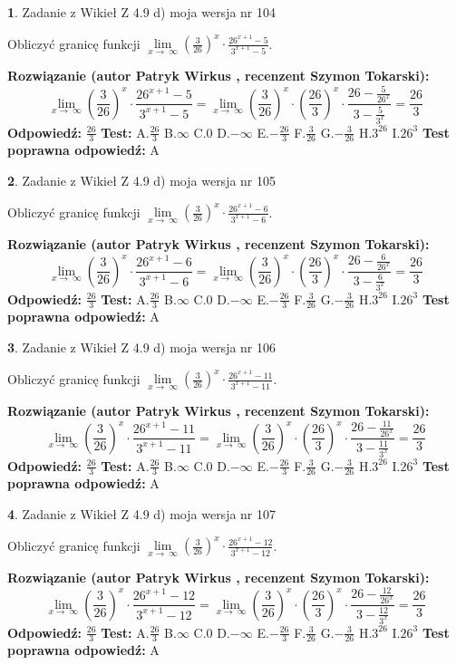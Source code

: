 \documentclass[12pt, a4paper]{article}
\theoremstyle{definition} %
\newtheorem{zad}{}
\newcommand{\zadStart}[1]{\begin{zad}#1\newline}
\newcommand{\zadStop}{\end{zad}}
\newcommand{\rozwStart}[2]{\noindent \textbf{Rozwiązanie (autor #1 , recenzent #2): }\newline}
\newcommand{\rozwStop}{\newline}
\newcommand{\odpStart}{\noindent \textbf{Odpowiedź:}\newline}
\newcommand{\odpStop}{\newline}
\newcommand{\testStart}{\noindent \textbf{Test:}\newline}
\newcommand{\testStop}{\newline}
\newcommand{\kluczStart}{\noindent \textbf{Test poprawna odpowiedź:}\newline}
\newcommand{\kluczStop}{\newline}
\begin{document}
\zadStart{Zadanie z Wikieł Z 4.9 d) moja wersja nr 104}


Obliczyć granicę funkcji  $\lim\limits_{x\to\ \infty}(\frac{3}{26})^{x}\cdot\frac{26^{x+1}-5}{3^{x+1}-5}$.
\zadStop
\rozwStart{Patryk Wirkus}{Szymon Tokarski}
$$\lim\limits_{x\to\ \infty}(\frac{3}{26})^{x}\cdot\frac{26^{x+1}-5}{3^{x+1}-5}=\lim\limits_{x\to\ \infty}(\frac{3}{26})^{x}\cdot(\frac{26}{3})^{x} \cdot \frac{26-\frac{5}{26^{x}}}{3-\frac{5}{3^{x}}} = \frac{26}{3}$$
\rozwStop
\odpStart
$\frac{26}{3}$
\odpStop
\testStart
A.$\frac{26}{3}$ B.$\infty$ C.$0$ D.$-\infty$ E.$-\frac{26}{3}$
F.$\frac{3}{26}$ G.$-\frac{3}{26}$
H.$3^{26}$
I.$26^{3}$
\testStop
\kluczStart
A
\kluczStop



\zadStart{Zadanie z Wikieł Z 4.9 d) moja wersja nr 105}


Obliczyć granicę funkcji  $\lim\limits_{x\to\ \infty}(\frac{3}{26})^{x}\cdot\frac{26^{x+1}-6}{3^{x+1}-6}$.
\zadStop
\rozwStart{Patryk Wirkus}{Szymon Tokarski}
$$\lim\limits_{x\to\ \infty}(\frac{3}{26})^{x}\cdot\frac{26^{x+1}-6}{3^{x+1}-6}=\lim\limits_{x\to\ \infty}(\frac{3}{26})^{x}\cdot(\frac{26}{3})^{x} \cdot \frac{26-\frac{6}{26^{x}}}{3-\frac{6}{3^{x}}} = \frac{26}{3}$$
\rozwStop
\odpStart
$\frac{26}{3}$
\odpStop
\testStart
A.$\frac{26}{3}$ B.$\infty$ C.$0$ D.$-\infty$ E.$-\frac{26}{3}$
F.$\frac{3}{26}$ G.$-\frac{3}{26}$
H.$3^{26}$
I.$26^{3}$
\testStop
\kluczStart
A
\kluczStop



\zadStart{Zadanie z Wikieł Z 4.9 d) moja wersja nr 106}


Obliczyć granicę funkcji  $\lim\limits_{x\to\ \infty}(\frac{3}{26})^{x}\cdot\frac{26^{x+1}-11}{3^{x+1}-11}$.
\zadStop
\rozwStart{Patryk Wirkus}{Szymon Tokarski}
$$\lim\limits_{x\to\ \infty}(\frac{3}{26})^{x}\cdot\frac{26^{x+1}-11}{3^{x+1}-11}=\lim\limits_{x\to\ \infty}(\frac{3}{26})^{x}\cdot(\frac{26}{3})^{x} \cdot \frac{26-\frac{11}{26^{x}}}{3-\frac{11}{3^{x}}} = \frac{26}{3}$$
\rozwStop
\odpStart
$\frac{26}{3}$
\odpStop
\testStart
A.$\frac{26}{3}$ B.$\infty$ C.$0$ D.$-\infty$ E.$-\frac{26}{3}$
F.$\frac{3}{26}$ G.$-\frac{3}{26}$
H.$3^{26}$
I.$26^{3}$
\testStop
\kluczStart
A
\kluczStop



\zadStart{Zadanie z Wikieł Z 4.9 d) moja wersja nr 107}


Obliczyć granicę funkcji  $\lim\limits_{x\to\ \infty}(\frac{3}{26})^{x}\cdot\frac{26^{x+1}-12}{3^{x+1}-12}$.
\zadStop
\rozwStart{Patryk Wirkus}{Szymon Tokarski}
$$\lim\limits_{x\to\ \infty}(\frac{3}{26})^{x}\cdot\frac{26^{x+1}-12}{3^{x+1}-12}=\lim\limits_{x\to\ \infty}(\frac{3}{26})^{x}\cdot(\frac{26}{3})^{x} \cdot \frac{26-\frac{12}{26^{x}}}{3-\frac{12}{3^{x}}} = \frac{26}{3}$$
\rozwStop
\odpStart
$\frac{26}{3}$
\odpStop
\testStart
A.$\frac{26}{3}$ B.$\infty$ C.$0$ D.$-\infty$ E.$-\frac{26}{3}$
F.$\frac{3}{26}$ G.$-\frac{3}{26}$
H.$3^{26}$
I.$26^{3}$
\testStop
\kluczStart
A
\kluczStop
\end{document}
